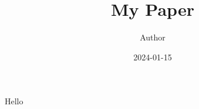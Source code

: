 \documentclass{article}
\title{My Paper}
\author{Author}
\date{2024-01-15}
\begin{document}
\maketitle
Hello
\end{document}
